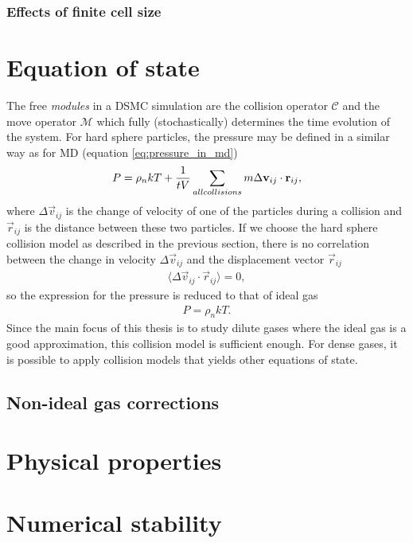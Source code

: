 \subsubsection{Effects of finite cell size}

\section{Equation of state}
\label{sec:dsmc_eos}
The free \textit{modules} in a DSMC simulation are the collision operator $\mathcal C$ and the move operator $\mathcal M$ which fully (stochastically) determines the time evolution of the system. For hard sphere particles, the pressure may be defined in a similar way as for MD (equation \eqref{eq:pressure_in_md})
\begin{align}
	P = \rho_nkT + {1\over tV}\sum_{all collisions} m\Delta \vec v_{ij}\cdot \vec r_{ij},
\end{align}
where $\Delta \vec v_{ij}$ is the change of velocity of one of the particles during a collision and $\vec r_{ij}$ is the distance between these two particles\cite{garcia1997direct}. If we choose the hard sphere collision model as described in the previous section, there is no correlation between the change in velocity $\Delta \vec v_{ij}$ and the displacement vector $\vec r_{ij}$
\begin{align}
	\langle \Delta \vec v_{ij}\cdot \vec r_{ij}\rangle = 0,
\end{align}
so the expression for the pressure is reduced to that of ideal gas
\begin{align}
	P = \rho_n kT.
\end{align}
Since the main focus of this thesis is to study dilute gases where the ideal gas is a good approximation, this collision model is sufficient enough. For dense gases, it is possible to apply collision models that yields other equations of state.
\subsection{Non-ideal gas corrections}

\section{Physical properties}


\section{Numerical stability}